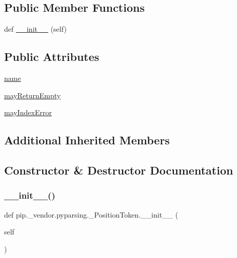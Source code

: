 \subsection*{Public Member Functions}
\begin{DoxyCompactItemize}
\item 
def \hyperlink{classpip_1_1__vendor_1_1pyparsing_1_1__PositionToken_ad335921a3af0dc39b7ed09c2301d0ecd}{\+\_\+\+\_\+init\+\_\+\+\_\+} (self)
\end{DoxyCompactItemize}
\subsection*{Public Attributes}
\begin{DoxyCompactItemize}
\item 
\hyperlink{classpip_1_1__vendor_1_1pyparsing_1_1__PositionToken_a03833aeb5bbc17ec9d66789a3e46120e}{name}
\item 
\hyperlink{classpip_1_1__vendor_1_1pyparsing_1_1__PositionToken_ae576e20d1d8235343fc776fce26f9f22}{may\+Return\+Empty}
\item 
\hyperlink{classpip_1_1__vendor_1_1pyparsing_1_1__PositionToken_aaea39ca9a07fdef6819086a637c8ce99}{may\+Index\+Error}
\end{DoxyCompactItemize}
\subsection*{Additional Inherited Members}


\subsection{Constructor \& Destructor Documentation}
\mbox{\label{classpip_1_1__vendor_1_1pyparsing_1_1__PositionToken_ad335921a3af0dc39b7ed09c2301d0ecd}} 
\subsubsection{\texorpdfstring{\+\_\+\+\_\+init\+\_\+\+\_\+()}{\_\_init\_\_()}}
{\footnotesize\ttfamily def pip.\+\_\+vendor.\+pyparsing.\+\_\+\+Position\+Token.\+\_\+\+\_\+init\+\_\+\+\_\+ (\begin{DoxyParamCaption}\item[{}]{self }\end{DoxyParamCaption})}



